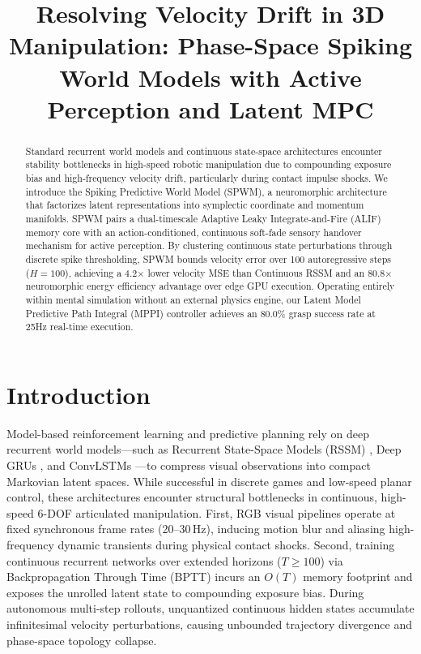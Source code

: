 \documentclass{article}
\begin{document}
\title{Resolving Velocity Drift in 3D Manipulation: Phase-Space Spiking World Models with Active Perception and Latent MPC}

\begin{abstract}
Standard recurrent world models and continuous state-space architectures encounter stability bottlenecks in high-speed robotic manipulation due to compounding exposure bias and high-frequency velocity drift, particularly during contact impulse shocks. We introduce the Spiking Predictive World Model (SPWM), a neuromorphic architecture that factorizes latent representations into symplectic coordinate and momentum manifolds. SPWM pairs a dual-timescale Adaptive Leaky Integrate-and-Fire (ALIF) memory core with an action-conditioned, continuous soft-fade sensory handover mechanism for active perception. By clustering continuous state perturbations through discrete spike thresholding, SPWM bounds velocity error over 100 autoregressive steps ($H=100$), achieving a 4.2$\times$ lower velocity MSE than Continuous RSSM and an 80.8$\times$ neuromorphic energy efficiency advantage over edge GPU execution. Operating entirely within mental simulation without an external physics engine, our Latent Model Predictive Path Integral (MPPI) controller achieves an 80.0\% grasp success rate at 25Hz real-time execution.
\end{abstract}

\section{Introduction}

Model-based reinforcement learning and predictive planning rely on deep recurrent world models—such as Recurrent State-Space Models (RSSM) \cite{hafner2019dreamer, hafner2025dreamerv3}, Deep GRUs \cite{cho2014learning}, and ConvLSTMs \cite{shi2015convolutional}—to compress visual observations into compact Markovian latent spaces. While successful in discrete games and low-speed planar control, these architectures encounter structural bottlenecks in continuous, high-speed 6-DOF articulated manipulation. First, RGB visual pipelines operate at fixed synchronous frame rates (20--30\,Hz), inducing motion blur and aliasing high-frequency dynamic transients during physical contact shocks. Second, training continuous recurrent networks over extended horizons ($T \ge 100$) via Backpropagation Through Time (BPTT) incurs an $O(T)$ memory footprint and exposes the unrolled latent state to compounding exposure bias. During autonomous multi-step rollouts, unquantized continuous hidden states accumulate infinitesimal velocity perturbations, causing unbounded trajectory divergence and phase-space topology collapse.
\end{document}
